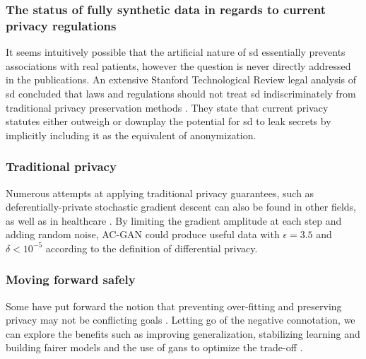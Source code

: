         \subsubsection{The status of fully synthetic data in regards to current privacy regulations}
        
            It seems intuitively possible that the artificial nature of \gls{sd} essentially prevents associations with real patients, however the question is never directly addressed in the publications. An extensive Stanford Technological Review legal analysis of \gls{sd} concluded that laws and regulations should not treat \gls{sd} indiscriminately from traditional privacy preservation methods \cite{bellovin2019privacy}. They state that current privacy statutes either outweigh or downplay the potential for \gls{sd} to leak secrets by implicitly including it as the equivalent of anonymization. 
            
        \subsubsection{Traditional privacy}
        
            Numerous attempts at applying traditional privacy guarantees, such as deferentially-private stochastic gradient descent can also be found in other fields, as well as in healthcare \cite{Beaulieu-Jones2019-ct, esteban2017real,chincheong2020generation, BaeAnomiGAN2020}. By limiting the gradient amplitude at each step and adding random noise, AC-GAN could produce useful data with $\epsilon=3.5$ and $\delta<10^{-5}$ according to the definition of differential privacy. \par 
        
        \subsubsection{Moving forward safely}
        
            Some have put forward the notion that preventing over-fitting and preserving privacy may not be conflicting goals \cite{Wu2019-ui,Mukherjee2019-vu,Zhu2020-oj}. Letting go of the negative connotation, we can explore the benefits such as improving generalization, stabilizing learning and building fairer models \cite{Zhu2020-oj} and the use of \glspl{gan} to optimize the trade-off \cite{Chen2019-mh}.\par
            
